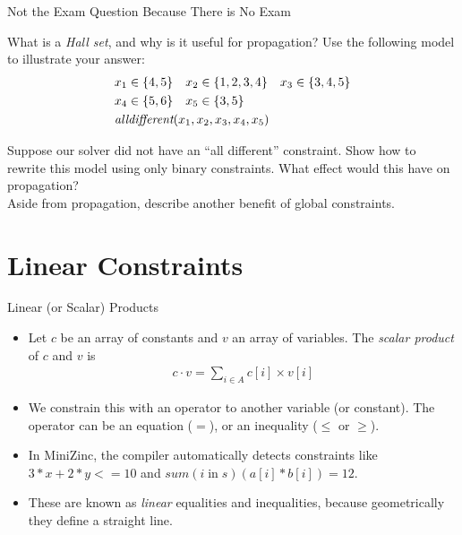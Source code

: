 \documentclass[aspectratio=169,compress,10pt]{beamer}
\begin{document}
\begin{frame}{Not the Exam Question Because There is No Exam}

    What is a \emph{Hall set}, and why is it useful for propagation? Use the following model to
    illustrate your answer:
    \begin{align*}
        & x_1 \in \{ 4, 5 \}   && x_2 \in \{ 1, 2, 3, 4 \}  && x_3 \in \{ 3, 4, 5 \} \\
        & x_4 \in \{ 5, 6 \}   && x_5 \in \{ 3, 5 \} \\
        & \mathrlap{\textit{alldifferent}( x_1, x_2, x_3, x_4, x_5 )}
    \end{align*}

    Suppose our solver did not have an ``all different'' constraint. Show how to rewrite this model
    using only binary constraints.  What effect would this have on propagation? \\[0.2cm]

    Aside from propagation, describe another benefit of global constraints.

\end{frame}

\section{Linear Constraints}

\begin{frame}{Linear (or Scalar) Products}
    \begin{itemize}
        \item Let $c$ be an array of constants and $v$ an array of variables. The \emph{scalar
            product} of $c$ and $v$ is \begin{align*}
        c \cdot v = \sum_{i \in A}{c[i] \times v[i]}\end{align*}
        \item We constrain this with an operator to another variable (or constant). The operator can
            be an equation ($=$), or an inequality ($\le$ or $\ge$).
        \item In MiniZinc, the compiler automatically detects constraints like $3 * x + 2 * y <= 10$
            and $sum(i \operatorname{in} s)(a[i] * b[i]) = 12$.
        \item These are known as \emph{linear} equalities and inequalities, because
            geometrically they define a straight line.
    \end{itemize}
\end{frame}
\end{document}
